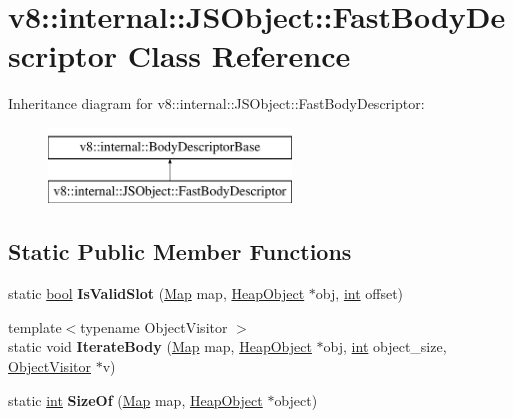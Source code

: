 \hypertarget{classv8_1_1internal_1_1JSObject_1_1FastBodyDescriptor}{}\section{v8\+:\+:internal\+:\+:J\+S\+Object\+:\+:Fast\+Body\+Descriptor Class Reference}
\label{classv8_1_1internal_1_1JSObject_1_1FastBodyDescriptor}
Inheritance diagram for v8\+:\+:internal\+:\+:J\+S\+Object\+:\+:Fast\+Body\+Descriptor\+:\begin{figure}[H]
\begin{center}
\leavevmode
\includegraphics[height=2.000000cm]{classv8_1_1internal_1_1JSObject_1_1FastBodyDescriptor}
\end{center}
\end{figure}
\subsection*{Static Public Member Functions}
\begin{DoxyCompactItemize}
\item 
\mbox{\label{classv8_1_1internal_1_1JSObject_1_1FastBodyDescriptor_ada8fc0dc3dddab9ebd0bb6d98a1d348c}} 
static \mbox{\hyperlink{classbool}{bool}} {\bfseries Is\+Valid\+Slot} (\mbox{\hyperlink{classv8_1_1internal_1_1Map}{Map}} map, \mbox{\hyperlink{classv8_1_1internal_1_1HeapObject}{Heap\+Object}} $\ast$obj, \mbox{\hyperlink{classint}{int}} offset)
\item 
\mbox{\label{classv8_1_1internal_1_1JSObject_1_1FastBodyDescriptor_ac5ce247ae9df1e6634d86d180513fd27}} 
{\footnotesize template$<$typename Object\+Visitor $>$ }\\static void {\bfseries Iterate\+Body} (\mbox{\hyperlink{classv8_1_1internal_1_1Map}{Map}} map, \mbox{\hyperlink{classv8_1_1internal_1_1HeapObject}{Heap\+Object}} $\ast$obj, \mbox{\hyperlink{classint}{int}} object\+\_\+size, \mbox{\hyperlink{classv8_1_1internal_1_1ObjectVisitor}{Object\+Visitor}} $\ast$v)
\item 
\mbox{\label{classv8_1_1internal_1_1JSObject_1_1FastBodyDescriptor_a5ae06c96c470f64e50a3bc682f682871}} 
static \mbox{\hyperlink{classint}{int}} {\bfseries Size\+Of} (\mbox{\hyperlink{classv8_1_1internal_1_1Map}{Map}} map, \mbox{\hyperlink{classv8_1_1internal_1_1HeapObject}{Heap\+Object}} $\ast$object)
\end{DoxyCompactItemize}
